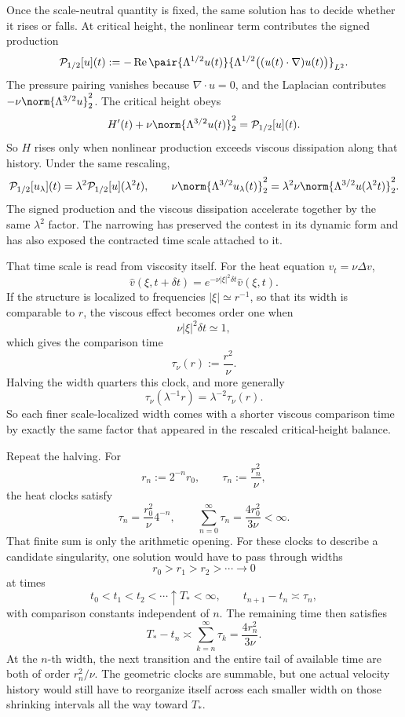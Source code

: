 
Once the scale-neutral quantity is fixed, the same solution has to decide whether it rises or falls. At critical height, the nonlinear term contributes the signed production
\[
  \mathcal P_{1/2}[u](t)
  :=
  -\operatorname{Re}
  \pair
    {\Lambda^{1/2}u(t)}
    {\Lambda^{1/2}\bigl((u(t)\cdot\nabla)u(t)\bigr)}_{L^2}.
\]
The pressure pairing vanishes because \(\nabla\cdot u=0\), and the Laplacian contributes \(-\nu\norm{\Lambda^{3/2}u}_2^2\). The critical height obeys
\[
  H'(t)
  +
  \nu\norm{\Lambda^{3/2}u(t)}_2^2
  =
  \mathcal P_{1/2}[u](t).
\]
So \(H\) rises only when nonlinear production exceeds viscous dissipation along that history. Under the same rescaling,
\[
  \mathcal P_{1/2}[u_\lambda](t)
  =
  \lambda^2\mathcal P_{1/2}[u](\lambda^2t),
  \qquad
  \nu\norm{\Lambda^{3/2}u_\lambda(t)}_2^2
  =
  \lambda^2\nu\norm{\Lambda^{3/2}u(\lambda^2t)}_2^2.
\]
The signed production and the viscous dissipation accelerate together by the same \(\lambda^2\) factor. The narrowing has preserved the contest in its dynamic form and has also exposed the contracted time scale attached to it.


That time scale is read from viscosity itself. For the heat equation \(v_t=\nu\Delta v\),
\[
  \widehat v(\xi,t+\delta t)
  =
  e^{-\nu|\xi|^2\delta t}\widehat v(\xi,t).
\]
If the structure is localized to frequencies \(|\xi|\simeq r^{-1}\), so that its width is comparable to \(r\), the viscous effect becomes order one when
\[
  \nu|\xi|^2\delta t\simeq1,
\]
which gives the comparison time
\[
  \tau_\nu(r)
  :=
  \frac{r^2}{\nu}.
\]
Halving the width quarters this clock, and more generally
\[
  \tau_\nu(\lambda^{-1}r)
  =
  \lambda^{-2}\tau_\nu(r).
\]
So each finer scale-localized width comes with a shorter viscous comparison time by exactly the same factor that appeared in the rescaled critical-height balance.


Repeat the halving. For
\[
  r_n:=2^{-n}r_0,
  \qquad
  \tau_n:=\frac{r_n^2}{\nu},
\]
the heat clocks satisfy
\[
  \tau_n
  =
  \frac{r_0^2}{\nu}4^{-n},
  \qquad
  \sum_{n=0}^{\infty}\tau_n
  =
  \frac{4r_0^2}{3\nu}
  <
  \infty.
\]
That finite sum is only the arithmetic opening. For these clocks to describe a candidate singularity, one \NavierStokes{} solution would have to pass through widths
\[
  r_0>r_1>r_2>\cdots\longrightarrow0
\]
at times
\[
  t_0<t_1<t_2<\cdots\uparrow T_*<\infty,
  \qquad
  t_{n+1}-t_n\asymp\tau_n,
\]
with comparison constants independent of \(n\). The remaining time then satisfies
\[
  T_*-t_n
  \asymp
  \sum_{k=n}^{\infty}\tau_k
  =
  \frac{4r_n^2}{3\nu}.
\]
At the \(n\)-th width, the next transition and the entire tail of available time are both of order \(r_n^2/\nu\). The geometric clocks are summable, but one actual velocity history would still have to reorganize itself across each smaller width on those shrinking intervals all the way toward \(T_*\).